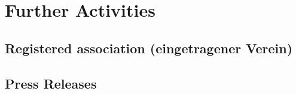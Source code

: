 ﻿\section{Further Activities}

\subsection{Registered association (eingetragener Verein)}
\tbc[by DB]

\subsection{Press Releases}
\tbc[by DB]

